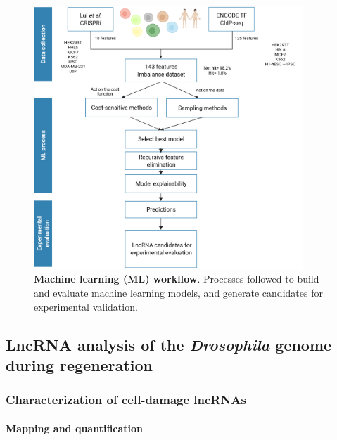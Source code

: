 \begin{figure}[!htb]
  \centering
  \includegraphics[width=0.9\textwidth]{img/methods/ml_project/flow_ml_lncRNA.png}
  \caption[Machine learning (ML) workflow]{\textbf{Machine learning (ML) workflow}. Processes followed to build and evaluate machine learning models, and generate candidates for experimental validation.}
  \label{fig:ml-workflow}
\end{figure}

\clearpage

\subsection{LncRNA analysis of the \textit{Drosophila} genome during regeneration}
\label{sec:noncoding-analysis-dme}

\subsubsection{Characterization of cell-damage lncRNAs}
\label{sec:chr-lncRNA-methods}

\paragraph{Mapping and quantification}
\label{sec:rna_seq_data_processiong_and_analysis}

